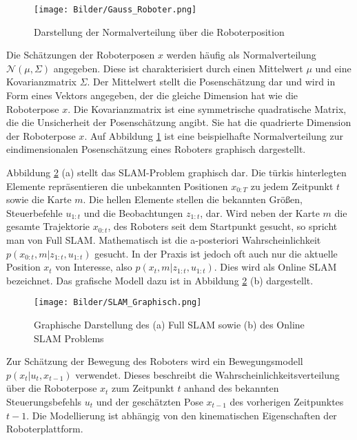 \begin{figure}
\centering
\texttt{[image: Bilder/Gauss\_Roboter.png]}
\caption{Darstellung der Normalverteilung über die Roboterposition}
\label{fig:Gauss}
\end{figure}

Die Schätzungen der Roboterposen $ x $ werden häufig als Normalverteilung $ \mathcal{N}(\mu,\Sigma) $ angegeben. Diese ist charakterisiert durch einen Mittelwert $ \mu $ und eine Kovarianzmatrix $ \Sigma $. Der Mittelwert stellt die Posenschätzung dar und wird in Form eines Vektors angegeben, der die gleiche Dimension hat wie die Roboterpose $ x $. Die Kovarianzmatrix ist eine symmetrische quadratische Matrix, die die Unsicherheit der Posenschätzung angibt. Sie hat die quadrierte Dimension der Roboterpose $ x $. Auf Abbildung \ref{fig:Gauss} ist eine beispielhafte Normalverteilung zur eindimensionalen Posenschätzung eines Roboters graphisch dargestellt.  

Abbildung \ref{fig:SLAM} (a) stellt das SLAM-Problem graphisch dar. Die türkis hinterlegten Elemente repräsentieren die unbekannten Positionen $x_{0:T}$ zu jedem Zeitpunkt $t$ sowie die Karte $m$. Die hellen Elemente stellen die bekannten Größen, Steuerbefehle $u_{1:t}$ und die Beobachtungen $z_{1:t}$, dar. Wird neben der Karte $ m $ die gesamte Trajektorie $x_{0:t}$, des Roboters seit dem Startpunkt gesucht, so spricht man von Full SLAM. Mathematisch ist die a-posteriori Wahrscheinlichkeit $ p(x_{0:t},m|z_{1:t},u_{1:t}) $ gesucht. In der Praxis ist jedoch oft auch nur die aktuelle Position $x_t$ von Interesse, also $p (x_{t},m|z_{1:t},u_{1:t})$. Dies wird als Online SLAM bezeichnet. Das grafische Modell dazu ist in Abbildung \ref{fig:SLAM} (b) dargestellt.

\begin{figure}
\centering
\texttt{[image: Bilder/SLAM\_Graphisch.png]}
\caption{Graphische Darstellung des (a) Full SLAM sowie (b) des Online SLAM Problems }
\label{fig:SLAM}
\end{figure}
   			
Zur Schätzung der Bewegung des Roboters wird ein Bewegungsmodell $ p(x_t \vert u_t,x_{t-1}) $ verwendet.  Dieses beschreibt die Wahrscheinlichkeitsverteilung über die Roboterpose $ x_t $ zum Zeitpunkt $ t $ anhand des bekannten Steuerungsbefehls $ u_t $ und der geschätzten Pose $ x_{t-1} $ des vorherigen Zeitpunktes $ t-1 $. Die Modellierung ist abhängig von den kinematischen Eigenschaften der Roboterplattform. 

